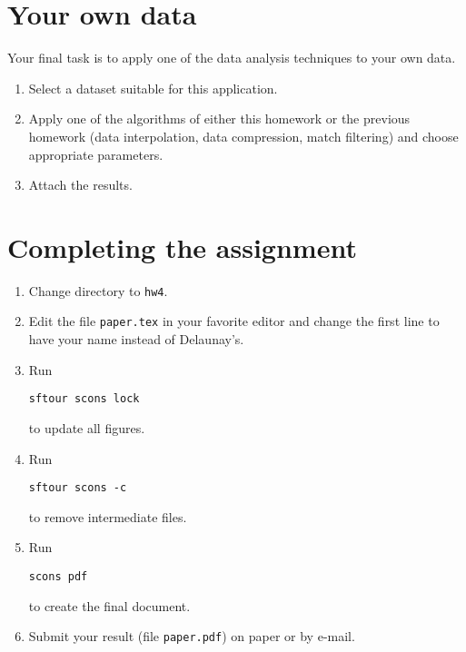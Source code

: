 \lstset{language=c,numbers=left,numberstyle=\tiny,showstringspaces=false}


\lstset{language=python,numbers=left,numberstyle=\tiny,showstringspaces=false}



\section{Your own data}

Your final task is to apply one of the data analysis techniques to your own data.
\begin{enumerate}
\item Select a dataset suitable for this application.
\item Apply one of the algorithms of either this homework or the
  previous homework (data interpolation, data compression, match
  filtering) and choose appropriate parameters.
\item Attach the results.
\end{enumerate}

\newpage

\section{Completing the assignment}

\begin{enumerate}
\item Change directory to \texttt{hw4}.
\item Edit the file \texttt{paper.tex} in your favorite editor and change the
  first line to have your name instead of Delaunay's.
\item Run
\begin{verbatim}
sftour scons lock
\end{verbatim}
to update all figures.
\item Run
\begin{verbatim}
sftour scons -c
\end{verbatim}
to remove intermediate files.
\item Run
\begin{verbatim}
scons pdf
\end{verbatim}
to create the final document.
\item Submit your result (file \texttt{paper.pdf}) on paper or by
e-mail.
\end{enumerate}



